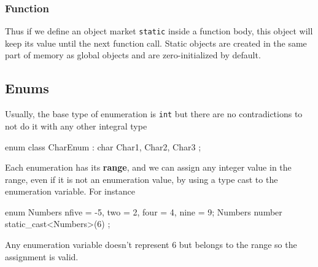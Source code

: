 \documentclass[../main]{subfiles}
\begin{document}
    \subsubsection{Function}
        \begin{center}
            \small
        \end{center}

    Thus if we define an object market \texttt{static} inside a function body, this object will keep its value until the next function call.
Static objects are created in the same part of memory as global objects and are zero-initialized by default.

\subsection{Enums}
    Usually, the base type of enumeration is \texttt{int} but there are no contradictions to not do it with any other integral type

\begin{Code}
    enum class CharEnum : char
    {
        Char1,
        Char2,
        Char3
    };
\end{Code}

    Each enumeration has its \textbf{range}, and we can assign any integer value in the range, even if it is not an enumeration value, by using a type cast to the enumeration variable.
For instance
\begin{Code}
    enum Numbers { nfive = -5, two = 2, four = 4, nine = 9};
    Numbers number { static_cast<Numbers>(6) };
\end{Code}
Any enumeration variable doesn't represent 6 but belongs to the range so the assignment is valid.\newline
\end{document}

